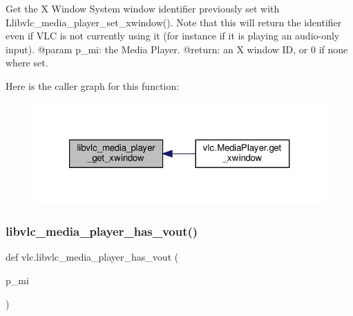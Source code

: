 \begin{DoxyVerb}Get the X Window System window identifier previously set with
L{libvlc_media_player_set_xwindow}(). Note that this will return the identifier
even if VLC is not currently using it (for instance if it is playing an
audio-only input).
@param p_mi: the Media Player.
@return: an X window ID, or 0 if none where set.
\end{DoxyVerb}
 Here is the caller graph for this function\+:
\nopagebreak
\begin{figure}[H]
\begin{center}
\leavevmode
\includegraphics[width=321pt]{namespacevlc_a9d0e29b3ab21c037abe445f60d224ae9_icgraph}
\end{center}
\end{figure}
\mbox{\label{namespacevlc_aa73c70b2cb89d51766a528e4ba329f06}} 
\subsubsection{\texorpdfstring{libvlc\+\_\+media\+\_\+player\+\_\+has\+\_\+vout()}{libvlc\_media\_player\_has\_vout()}}
{\footnotesize\ttfamily def vlc.\+libvlc\+\_\+media\+\_\+player\+\_\+has\+\_\+vout (\begin{DoxyParamCaption}\item[{}]{p\+\_\+mi }\end{DoxyParamCaption})}

